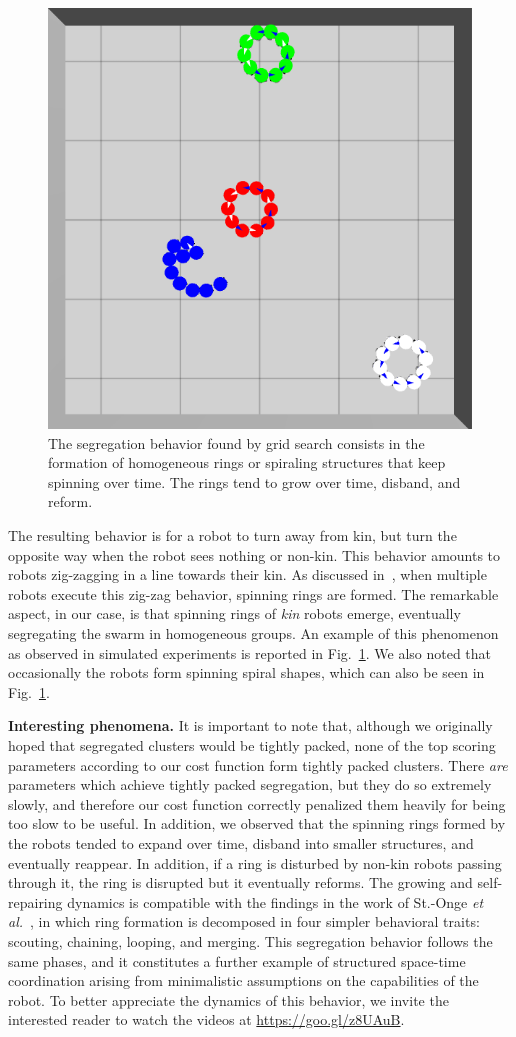 \documentclass[letterpaper, 10 pt, conference]{ieeeconf}
\newcommand{\myparagraph}[1]{\textbf{#1.}}
\begin{document}
\begin{figure}[t]
  \centering
  \includegraphics[width=0.5\linewidth]{./images/rings_example.png}
  \caption{The segregation behavior found by grid search consists in the
    formation of homogeneous rings or spiraling structures that keep spinning
    over time. The rings tend to grow over time, disband, and reform.}
  \label{fig:rings}
\end{figure}
The resulting behavior is for a robot to turn away from kin, but turn the
opposite way when the robot sees nothing or non-kin. This behavior amounts to
robots zig-zagging in a line towards their kin. As discussed
in~\cite{StOnge:IROS2018}, when multiple robots execute this zig-zag behavior,
spinning rings are formed. The remarkable aspect, in our case, is that spinning
rings of \emph{kin} robots emerge, eventually segregating the swarm in
homogeneous groups. An example of this phenomenon as observed in simulated
experiments is reported in Fig.~\ref{fig:rings}. We also noted that occasionally the
robots form spinning spiral shapes, which can also be seen in
Fig.~\ref{fig:rings}.

\myparagraph{Interesting phenomena}
It is important to note that, although we originally hoped that segregated
clusters would be tightly packed, none of the top scoring parameters according
to our cost function form tightly packed clusters. There \emph{are} parameters
which achieve tightly packed segregation, but they do so extremely slowly, and
therefore our cost function correctly penalized them heavily for being too slow
to be useful. In addition, we observed that the spinning rings formed by the
robots tended to expand over time, disband into smaller structures, and
eventually reappear. In addition, if a ring is disturbed by non-kin robots
passing through it, the ring is disrupted but it eventually reforms. The growing
and self-repairing dynamics is compatible with the findings in the work of
St.-Onge \emph{et al.}~\cite{StOnge:IROS2018}, in which ring formation is
decomposed in four simpler behavioral traits: scouting, chaining, looping, and
merging. This segregation behavior follows the same phases, and it constitutes a
further example of structured space-time coordination arising from minimalistic
assumptions on the capabilities of the robot. To better appreciate the dynamics
of this behavior, we invite the interested reader to watch the videos at
\href{https://www.youtube.com/playlist?list=PL9HqYJ1IkIKVX9EsT5BY9LnBsBPTjc5bB}{https://goo.gl/z8UAuB}.
\end{document}
